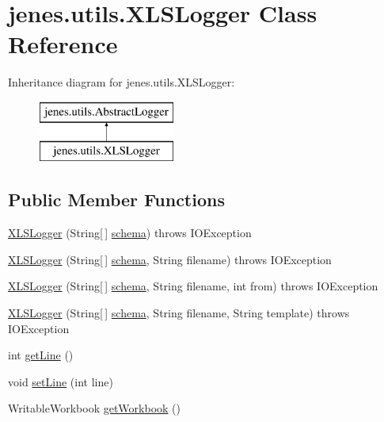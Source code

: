 \hypertarget{classjenes_1_1utils_1_1_x_l_s_logger}{\section{jenes.\-utils.\-X\-L\-S\-Logger Class Reference}
\label{classjenes_1_1utils_1_1_x_l_s_logger}
}
Inheritance diagram for jenes.\-utils.\-X\-L\-S\-Logger\-:\begin{figure}[H]
\begin{center}
\leavevmode
\includegraphics[height=2.000000cm]{classjenes_1_1utils_1_1_x_l_s_logger}
\end{center}
\end{figure}
\subsection*{Public Member Functions}
\begin{DoxyCompactItemize}
\item 
\hyperlink{classjenes_1_1utils_1_1_x_l_s_logger_a1fa625f6c332aca9178b1c7a4eb963d8}{X\-L\-S\-Logger} (String\mbox{[}$\,$\mbox{]} \hyperlink{classjenes_1_1utils_1_1_abstract_logger_a3a2030876857a0512fae7e0ad400c570}{schema})  throws I\-O\-Exception 
\item 
\hyperlink{classjenes_1_1utils_1_1_x_l_s_logger_a256b5ddf3beaa1eedb2290b52bb1a845}{X\-L\-S\-Logger} (String\mbox{[}$\,$\mbox{]} \hyperlink{classjenes_1_1utils_1_1_abstract_logger_a3a2030876857a0512fae7e0ad400c570}{schema}, String filename)  throws I\-O\-Exception 
\item 
\hyperlink{classjenes_1_1utils_1_1_x_l_s_logger_ac43b3385840e86a2ad4acd5040e8326b}{X\-L\-S\-Logger} (String\mbox{[}$\,$\mbox{]} \hyperlink{classjenes_1_1utils_1_1_abstract_logger_a3a2030876857a0512fae7e0ad400c570}{schema}, String filename, int from)  throws I\-O\-Exception 
\item 
\hyperlink{classjenes_1_1utils_1_1_x_l_s_logger_a2e438a48213dd4e1773c380d7f9d7e4b}{X\-L\-S\-Logger} (String\mbox{[}$\,$\mbox{]} \hyperlink{classjenes_1_1utils_1_1_abstract_logger_a3a2030876857a0512fae7e0ad400c570}{schema}, String filename, String template)  throws I\-O\-Exception 
\item 
int \hyperlink{classjenes_1_1utils_1_1_x_l_s_logger_a60e8ee28d3d3305e085726026e09cfdc}{get\-Line} ()
\item 
void \hyperlink{classjenes_1_1utils_1_1_x_l_s_logger_a2f9ce5372263fadce99a863149f3cb55}{set\-Line} (int line)
\item 
Writable\-Workbook \hyperlink{classjenes_1_1utils_1_1_x_l_s_logger_ab84e4c5e6518902f710cd3c3cc337f3d}{get\-Workbook} ()
\end{DoxyCompactItemize}
